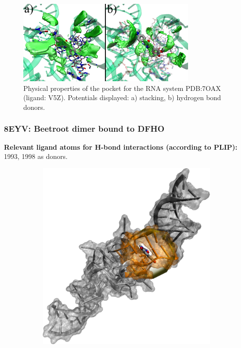      \begin{figure}[H]
        \centering
        \includegraphics[width=0.8\textwidth]{figures/results/benchmark_rna/7oax1.png}
        \caption{\label{fig:benchmark/7oax1} Physical properties of the pocket for the RNA system PDB:7OAX (ligand: V5Z). Potentials displayed: a) stacking, b) hydrogen bond donors.}
      \end{figure}
    \pagebreak

    \subsubsection{8EYV: Beetroot dimer bound to DFHO}
      \textbf{Relevant ligand atoms for H-bond interactions (according to PLIP):} 1993, 1998 as donors.

      \begin{figure}[H] \centering
        \begin{subfigure}[c]{0.3\textwidth} \centering
          \includegraphics[width=1\textwidth]{figures/results/ps_rna/8eyv.png}
        \end{subfigure}
        \begin{subfigure}[c]{0.3\textwidth} \centering
        \end{subfigure}
      \end{figure}

